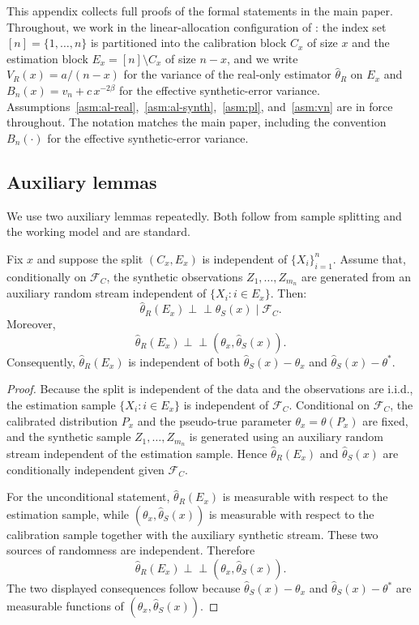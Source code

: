 \label{app:proofs}

This appendix collects full proofs of the formal statements in the main paper. Throughout, we work in the linear-allocation configuration of : the index set $[n] = \{1, \dots, n\}$ is partitioned into the calibration block $C_x$ of size $x$ and the estimation block $E_x = [n] \setminus C_x$ of size $n - x$, and we write $V_R(x) = a / (n-x)$ for the variance of the real-only estimator $\hat\theta_R$ on $E_x$ and $B_n(x) = v_n + c\, x^{-2\beta}$ for the effective synthetic-error variance. Assumptions~\ref{asm:al-real},~\ref{asm:al-synth},~\ref{asm:pl}, and~\ref{asm:vn} are in force throughout. The notation matches the main paper, including the convention $B_n(\cdot)$ for the effective synthetic-error variance.

\subsection{Auxiliary lemmas}\label{ssec:aux}

We use two auxiliary lemmas repeatedly. Both follow from sample splitting and the working model and are standard.

\begin{lemma}
\label{lem:ci} Fix $x$ and suppose the split $(C_x,E_x)$ is  independent of $\{X_i\}_{i=1}^n$. Assume that, conditionally on $\mathcal F_C$, the synthetic observations $Z_1,\ldots,Z_{m_n}$ are generated from an auxiliary random stream independent of $\{X_i:i\in E_x\}$. Then:
\[
\hat\theta_R(E_x)\perp\!\!\!\perp \hat\theta_S(x)\mid \mathcal F_C.
\]
Moreover,
\[
\hat\theta_R(E_x)\perp\!\!\!\perp (\theta_x,\hat\theta_S(x)).
\]
Consequently, $\hat\theta_R(E_x)$ is independent of both $\hat\theta_S(x)-\theta_x$ and $\hat\theta_S(x)-\theta^*$.
\end{lemma}

\begin{proof}
Because the split is independent of the data and the observations are i.i.d., the estimation sample $\{X_i:i\in E_x\}$ is independent of $\mathcal F_C$. Conditional on $\mathcal F_C$, the calibrated distribution $P_x$ and the pseudo-true parameter $\theta_x=\theta(P_x)$ are fixed, and the synthetic sample $Z_1,\ldots,Z_{m_n}$ is generated using an auxiliary random stream independent of the estimation sample. Hence $\hat\theta_R(E_x)$ and $\hat\theta_S(x)$ are conditionally independent given $\mathcal F_C$.

For the unconditional statement, $\hat\theta_R(E_x)$ is measurable with respect to the estimation sample, while $(\theta_x,\hat\theta_S(x))$ is measurable with respect to the calibration sample together with the auxiliary synthetic stream. These two sources of randomness are independent. Therefore
\[
\hat\theta_R(E_x)\perp\!\!\!\perp (\theta_x,\hat\theta_S(x)).
\]
The two displayed consequences follow because $\hat\theta_S(x)-\theta_x$ and $\hat\theta_S(x)-\theta^*$ are measurable functions of $(\theta_x,\hat\theta_S(x))$.
\end{proof}

